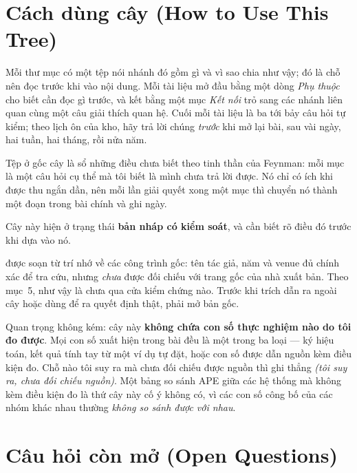 \documentclass[vslam.tex]{subfiles}
\begin{document}
\section*{Cách dùng cây (How to Use This Tree)}

Mỗi thư mục có một tệp  nói nhánh đó gồm gì và vì sao chia như vậy; đó là chỗ nên đọc trước khi vào nội dung. Mỗi tài liệu mở đầu bằng một dòng \emph{Phụ thuộc} cho biết cần đọc gì trước, và kết bằng một mục \emph{Kết nối} trỏ sang các nhánh liên quan cùng một câu giải thích quan hệ. Cuối mỗi tài liệu là ba tới bảy câu hỏi tự kiểm; theo lịch ôn của kho, hãy trả lời chúng \emph{trước} khi mở lại bài, sau vài ngày, hai tuần, hai tháng, rồi nửa năm.

Tệp  ở gốc cây là sổ những điều chưa biết theo tinh thần của Feynman: mỗi mục là một câu hỏi cụ thể mà tôi biết là mình chưa trả lời được. Nó chỉ có ích khi được thu ngắn dần, nên mỗi lần giải quyết xong một mục thì chuyển nó thành một đoạn trong bài chính và ghi ngày.

\begin{cambay}
Cây này hiện ở trạng thái \textbf{bản nháp có kiểm soát}, và cần biết rõ điều đó trước khi dựa vào nó.

 được soạn từ trí nhớ về các công trình gốc: tên tác giả, năm và venue đủ chính xác để tra cứu, nhưng \emph{chưa} được đối chiếu với trang gốc của nhà xuất bản. Theo  mục~5, như vậy là chưa qua cửa kiểm chứng nào. Trước khi trích dẫn ra ngoài cây hoặc dùng để ra quyết định thật, phải mở bản gốc.

Quan trọng không kém: cây này \textbf{không chứa con số thực nghiệm nào do tôi đo được}. Mọi con số xuất hiện trong bài đều là một trong ba loại --- ký hiệu toán, kết quả tính tay từ một ví dụ tự đặt, hoặc con số được dẫn nguồn kèm điều kiện đo. Chỗ nào tôi suy ra mà chưa đối chiếu được nguồn thì ghi thẳng \emph{(tôi suy ra, chưa đối chiếu nguồn)}. Một bảng so sánh APE giữa các hệ thống mà không kèm điều kiện đo là thứ cây này cố ý không có, vì các con số công bố của các nhóm khác nhau thường \emph{không so sánh được với nhau}.
\end{cambay}

\section*{Câu hỏi còn mở (Open Questions)}
\end{document}
